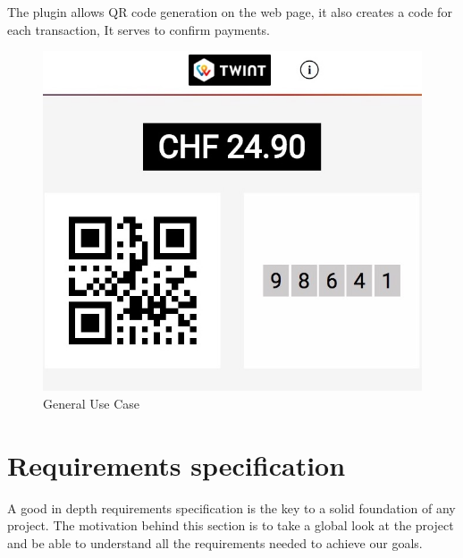 \begin{spacing}{1.2}
\begin{itemize}
The plugin allows QR code generation on the web page, it also creates a code for each transaction, It serves to confirm payments.
\begin{figure}[!ht]\centering
\includegraphics[scale=0.3]{twint.jpg}
\caption{General Use Case}
\label{fig:fig1}
\end{figure}
  \end{itemize}
  
  

\section{Requirements specification}
A good in depth requirements specification is the key to a solid foundation of any project.
The motivation behind this section is to take a global look at the project and be able to understand all the requirements needed to achieve our goals.

\end{spacing}
